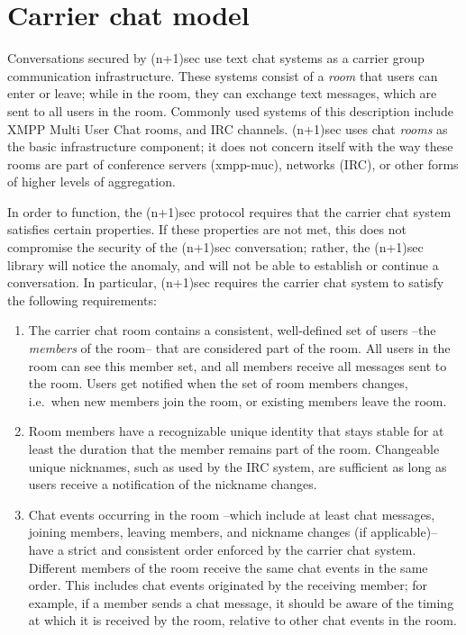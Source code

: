 \documentclass{article}
\begin{document}
\section{Carrier chat model}
\label{sec:carrier-chat-model}

Conversations secured by (n+1)sec use text chat systems as a carrier group communication infrastructure.
These systems consist of a \emph{room} that users can enter or leave; while in the room, they can exchange text messages, which are sent to all users in the room.
Commonly used systems of this description include XMPP Multi User Chat rooms, and IRC channels.
(n+1)sec uses chat \emph{rooms} as the basic infrastructure component; it does not concern itself with the way these rooms are part of conference servers (xmpp-muc), networks (IRC), or other forms of higher levels of aggregation.

In order to function, the (n+1)sec protocol requires that the carrier chat system satisfies certain properties.
If these properties are not met, this does not compromise the security of the (n+1)sec conversation; rather, the (n+1)sec library will notice the anomaly, and will not be able to establish or continue a conversation.
In particular, (n+1)sec requires the carrier chat system to satisfy the following requirements:
\begin{enumerate}
\item The carrier chat room contains a consistent, well-defined set of users --the \emph{members} of the room-- that are considered part of the room. All users in the room can see this member set, and all members receive all messages sent to the room. Users get notified when the set of room members changes, i.e.\ when new members join the room, or existing members leave the room.
\item Room members have a recognizable unique identity that stays stable for at least the duration that the member remains part of the room. Changeable unique nicknames, such as used by the IRC system, are sufficient as long as users receive a notification of the nickname changes.
\item \label{enum:carrier-chat-model/chat-event-order} Chat events occurring in the room --which include at least chat messages, joining members, leaving members, and nickname changes (if applicable)-- have a strict and consistent order enforced by the carrier chat system. Different members of the room receive the same chat events in the same order. This includes chat events originated by the receiving member; for example, if a member sends a chat message, it should be aware of the timing at which it is received by the room, relative to other chat events in the room.
\end{enumerate}
\end{document}

